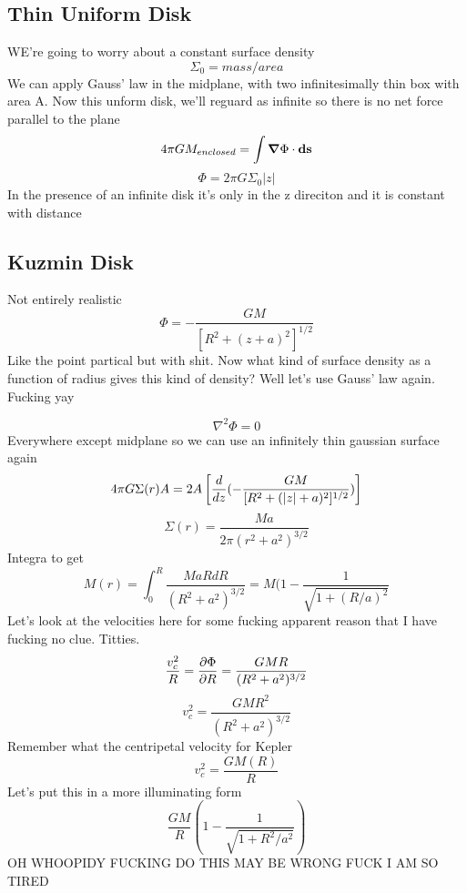 \subsection{Thin Uniform Disk}
WE're going to worry about a constant surface density
\begin{equation}
\Sigma_0 = mass/area
\end{equation}
We can apply Gauss' law in the midplane, with two infinitesimally thin box with area A. Now this unform disk, we'll reguard as infinite so there is no net force parallel to the plane
\begin{equation}
4\pi G M_{enclosed} = \int \mbox{\boldmath$ \nabla $} \Phi \cdot \mathbf{ds}
\end{equation}
\begin{equation}
\Phi = 2\pi G\Sigma_0 |z|
\end{equation}
In the presence of an infinite disk it's only in the z direciton and it is constant with distance

\subsection{Kuzmin Disk}
Not entirely realistic
\begin{equation}
\Phi =-\frac{GM}{[R^2 + (z + a)^2]^{1/2}}
\end{equation}
Like the point partical but with shit. Now what kind of surface density as a function of radius gives this kind of density? Well let's use Gauss' law again. Fucking yay
    
\begin{equation}
\nabla^2 \Phi = 0
\end{equation}
Everywhere except midplane so we can use an infinitely thin gaussian surface again
\begin{equation}
4\pi G \Sigma(r)A = 2A \left[\frac{d }{d z}(-\frac{GM}{[R^2 + (|z| + a)^2]^{1/2}})\right]
\end{equation}
\begin{equation}
\Sigma(r) = \frac{Ma}{2\pi (r^2 + a^2)^{3/2}} 
\end{equation}
Integra to get
\begin{equation}
M(r) = \int_0^R \frac{MaR dR}{(R^2 + a^2)^{3/2}} = M(1 - \frac{1}{\sqrt{1 + (R/a)^2}}
\end{equation}
Let's look at the velocities here for some fucking apparent reason that I have fucking no clue. Titties.
\begin{equation}
\frac{v_c^2}{R} = \frac{\partial \Phi}{\partial R} = \frac{GMR}{(R^2 + a^2)^{3/2}}
\end{equation}
\begin{equation}
v_c^2 = \frac{GMR^2}{(R^2 + a^2)^{3/2}}
\end{equation}
Remember what the centripetal velocity for Kepler
\begin{equation}
v_c^2 = \frac{GM(R)}{R}
\end{equation}
Let's put this in a more illuminating form
\begin{equation}
\frac{GM}{R} \left(1 - \frac{1}{\sqrt{ 1 + R^2/a^2}} \right)
\end{equation}
OH WHOOPIDY FUCKING DO THIS MAY BE WRONG FUCK I AM SO TIRED

